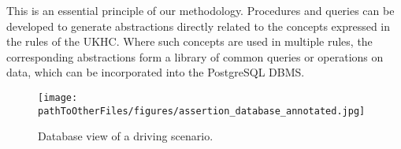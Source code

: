 This is an essential principle of our methodology. Procedures and queries can be developed to generate abstractions directly related to the concepts expressed in the rules of the UKHC. 
Where such concepts are used in multiple rules, the corresponding abstractions form a library of common queries or operations on data, which can be incorporated into the PostgreSQL DBMS. %
%
%
%        
%

\begin{figure}
    \centering
    \texttt{[image: \\pathToOtherFiles/figures/assertion\_database\_annotated.jpg]}
    \caption{Database view of a driving scenario.}
    \label{fig:assertion_database_annotated}
\end{figure}

